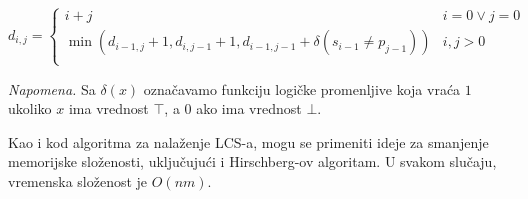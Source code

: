 \begin{equation}
    d_{i,j} = \begin{cases}
        i+j & i=0 \vee j=0 \\
        \min(d_{i-1,j}+1, d_{i,j-1}+1, d_{i-1,j-1}+\delta(s_{i-1} \not = p_{j-1})) & i,j > 0 \\
    \end{cases}
\end{equation}

\textit{Napomena.} Sa $\delta(x)$ ozna\v cavamo funkciju logi\v cke promenljive koja vra\' ca $1$ ukoliko $x$ ima vrednost $\top$, a $0$ ako ima vrednost $\bot$.

\noindent
\begin{minipage}[l]{\textwidth}

\end{minipage}

Kao i kod algoritma za nala\v zenje LCS-a, mogu se primeniti ideje za smanjenje memorijske slo\v zenosti, uklju\v cuju\' ci i Hirschberg-ov algoritam. U svakom slu\v caju, vremenska slo\v zenost je $O(nm)$.